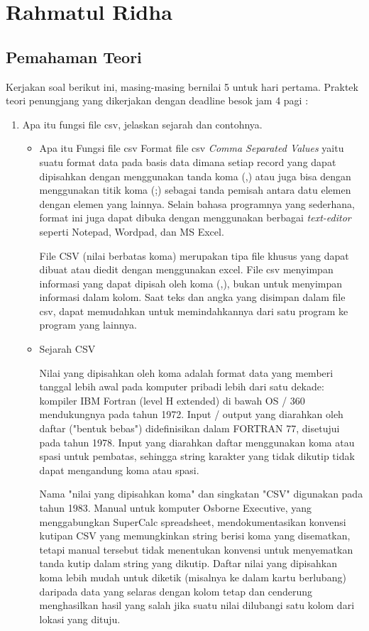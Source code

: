 

\section{Rahmatul Ridha}
\subsection{Pemahaman Teori}
Kerjakan soal berikut ini, masing-masing bernilai 5 untuk hari pertama. Praktek teori penungjang yang dikerjakan dengan deadline besok jam 4 pagi :
\begin{enumerate}
 \item Apa itu fungsi file csv, jelaskan sejarah dan contohnya.
   \begin{itemize}
    \item Apa itu Fungsi file csv
     Format file csv \textit{Comma Separated Values} yaitu suatu format data pada basis data dimana setiap record yang dapat dipisahkan dengan menggunakan tanda koma (,) atau juga bisa dengan menggunakan titik koma (;) sebagai tanda pemisah antara datu elemen dengan elemen yang lainnya. Selain bahasa programnya yang sederhana, format ini juga dapat dibuka dengan menggunakan berbagai \textit{text-editor} seperti Notepad, Wordpad, dan MS Excel.

     File CSV (nilai berbatas koma) merupakan tipa file khusus yang dapat dibuat atau diedit dengan menggunakan excel. File csv menyimpan informasi yang dapat dipisah oleh koma (,), bukan untuk menyimpan informasi dalam kolom. Saat teks dan angka yang disimpan dalam file csv, dapat memudahkan untuk memindahkannya dari satu program ke program yang lainnya.

    \item Sejarah CSV

     Nilai yang dipisahkan oleh koma adalah format data yang memberi tanggal lebih awal pada komputer pribadi lebih dari satu dekade: kompiler IBM Fortran (level H extended) di bawah OS / 360 mendukungnya pada tahun 1972. Input / output yang diarahkan oleh daftar ("bentuk bebas") didefinisikan dalam FORTRAN 77, disetujui pada tahun 1978. Input yang diarahkan daftar menggunakan koma atau spasi untuk pembatas, sehingga string karakter yang tidak dikutip tidak dapat mengandung koma atau spasi.

     Nama "nilai yang dipisahkan koma" dan singkatan "CSV" digunakan pada tahun 1983. Manual untuk komputer Osborne Executive, yang menggabungkan SuperCalc spreadsheet, mendokumentasikan konvensi kutipan CSV yang memungkinkan string berisi koma yang disematkan, tetapi manual tersebut tidak menentukan konvensi untuk menyematkan tanda kutip dalam string yang dikutip. Daftar nilai yang dipisahkan koma lebih mudah untuk diketik (misalnya ke dalam kartu berlubang) daripada data yang selaras dengan kolom tetap dan cenderung menghasilkan hasil yang salah jika suatu nilai dilubangi satu kolom dari lokasi yang dituju.


\end{itemize}
\end{enumerate}

